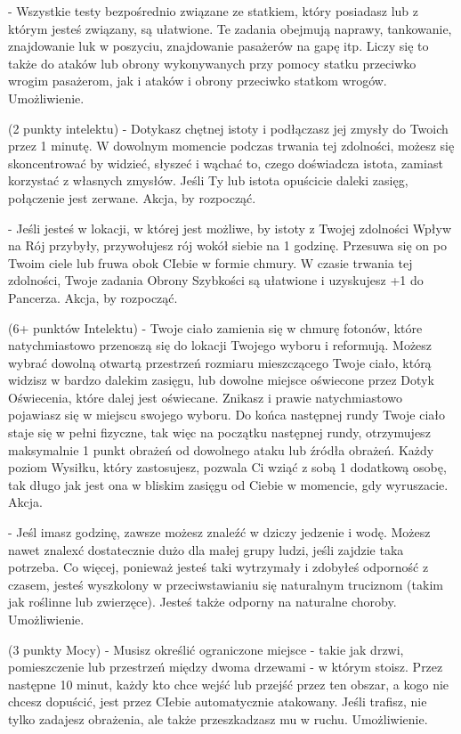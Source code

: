 { - Wszystkie testy bezpośrednio związane ze statkiem, który posiadasz lub z którym jesteś związany, są ułatwione. Te zadania obejmują naprawy, tankowanie, znajdowanie luk w poszyciu, znajdowanie pasażerów na gapę itp. Liczy się to także do ataków lub obrony wykonywanych przy pomocy statku przeciwko wrogim pasażerom, jak i ataków i obrony przeciwko statkom wrogów. Umożliwienie.

 (2 punkty intelektu) - Dotykasz chętnej istoty i podłączasz jej zmysły do Twoich przez 1 minutę. W dowolnym momencie podczas trwania tej zdolności, możesz się skoncentrować by widzieć, słyszeć i wąchać to, czego doświadcza istota, zamiast korzystać z własnych zmysłów. Jeśli Ty lub istota opuścicie daleki zasięg, połączenie jest zerwane.  Akcja, by rozpocząć.

 - Jeśli jesteś w lokacji, w której jest możliwe, by istoty z Twojej zdolności Wpływ na Rój przybyły, przywołujesz rój wokół siebie na 1 godzinę. Przesuwa się on po Twoim ciele lub fruwa obok CIebie w formie chmury. W czasie trwania tej zdolności, Twoje zadania Obrony Szybkości są ułatwione i uzyskujesz +1 do Pancerza. Akcja, by rozpocząć. 

 (6+ punktów Intelektu) - Twoje ciało zamienia się w chmurę fotonów, które natychmiastowo przenoszą się do lokacji Twojego wyboru i reformują. Możesz wybrać dowolną otwartą przestrzeń rozmiaru mieszczącego Twoje ciało, którą widzisz w bardzo dalekim zasięgu, lub dowolne miejsce oświecone przez Dotyk Oświecenia, które dalej jest oświecane. Znikasz i prawie natychmiastowo pojawiasz się w miejscu swojego wyboru. Do końca następnej rundy Twoje ciało staje się w pełni fizyczne, tak więc na początku następnej rundy, otrzymujesz maksymalnie 1 punkt obrażeń od dowolnego ataku lub źródła obrażeń. Każdy poziom Wysiłku, który zastosujesz, pozwala Ci wziąć z sobą 1 dodatkową osobę, tak długo jak jest ona w bliskim zasięgu od Ciebie w momencie, gdy wyruszacie. Akcja. 

 - Jeśl imasz godzinę, zawsze możesz znaleźć w dziczy jedzenie i wodę. Możesz nawet znalexć dostatecznie dużo dla małej grupy ludzi, jeśli zajdzie taka potrzeba. Co więcej, ponieważ jesteś taki wytrzymały i zdobyłeś odporność z czasem, jesteś wyszkolony w przeciwstawianiu się naturalnym truciznom (takim jak roślinne lub zwierzęce). Jesteś także odporny na naturalne choroby. Umożliwienie.

 (3 punkty Mocy) - Musisz określić ograniczone miejsce - takie jak drzwi, pomieszczenie lub przestrzeń między dwoma drzewami - w którym stoisz. Przez następne 10 minut, każdy kto chce wejść lub przejść przez ten obszar, a kogo nie chcesz dopuścić, jest przez CIebie automatycznie atakowany. Jeśli trafisz, nie tylko zadajesz obrażenia, ale także przeszkadzasz mu w ruchu. Umożliwienie.

}
